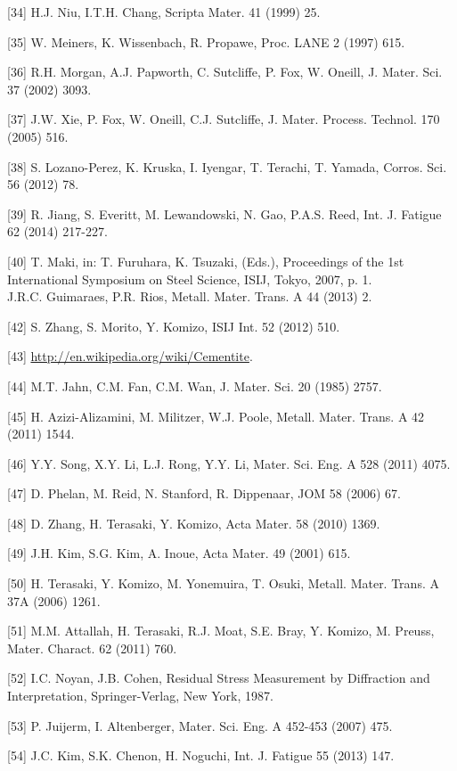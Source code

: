 \documentclass[10pt]{article}
\begin{document}
[34] H.J. Niu, I.T.H. Chang, Scripta Mater. 41 (1999) 25.

[35] W. Meiners, K. Wissenbach, R. Propawe, Proc. LANE 2 (1997) 615.

[36] R.H. Morgan, A.J. Papworth, C. Sutcliffe, P. Fox, W. Oneill, J. Mater. Sci. 37 (2002) 3093.

[37] J.W. Xie, P. Fox, W. Oneill, C.J. Sutcliffe, J. Mater. Process. Technol. 170 (2005) 516.

[38] S. Lozano-Perez, K. Kruska, I. Iyengar, T. Terachi, T. Yamada, Corros. Sci. 56 (2012) 78.

[39] R. Jiang, S. Everitt, M. Lewandowski, N. Gao, P.A.S. Reed, Int. J. Fatigue 62 (2014) 217-227.

[40] T. Maki, in: T. Furuhara, K. Tsuzaki, (Eds.), Proceedings of the 1st International Symposium on Steel Science, ISIJ, Tokyo, 2007, p. 1.\\
[41] J.R.C. Guimaraes, P.R. Rios, Metall. Mater. Trans. A 44 (2013) 2.

[42] S. Zhang, S. Morito, Y. Komizo, ISIJ Int. 52 (2012) 510.

[43] \href{http://en.wikipedia.org/wiki/Cementite}{http://en.wikipedia.org/wiki/Cementite}.

[44] M.T. Jahn, C.M. Fan, C.M. Wan, J. Mater. Sci. 20 (1985) 2757.

[45] H. Azizi-Alizamini, M. Militzer, W.J. Poole, Metall. Mater. Trans. A 42 (2011) 1544.

[46] Y.Y. Song, X.Y. Li, L.J. Rong, Y.Y. Li, Mater. Sci. Eng. A 528 (2011) 4075.

[47] D. Phelan, M. Reid, N. Stanford, R. Dippenaar, JOM 58 (2006) 67.

[48] D. Zhang, H. Terasaki, Y. Komizo, Acta Mater. 58 (2010) 1369.

[49] J.H. Kim, S.G. Kim, A. Inoue, Acta Mater. 49 (2001) 615.

[50] H. Terasaki, Y. Komizo, M. Yonemuira, T. Osuki, Metall. Mater. Trans. A 37A (2006) 1261.

[51] M.M. Attallah, H. Terasaki, R.J. Moat, S.E. Bray, Y. Komizo, M. Preuss, Mater. Charact. 62 (2011) 760.

[52] I.C. Noyan, J.B. Cohen, Residual Stress Measurement by Diffraction and Interpretation, Springer-Verlag, New York, 1987.

[53] P. Juijerm, I. Altenberger, Mater. Sci. Eng. A 452-453 (2007) 475.

[54] J.C. Kim, S.K. Chenon, H. Noguchi, Int. J. Fatigue 55 (2013) 147.
\end{document}
